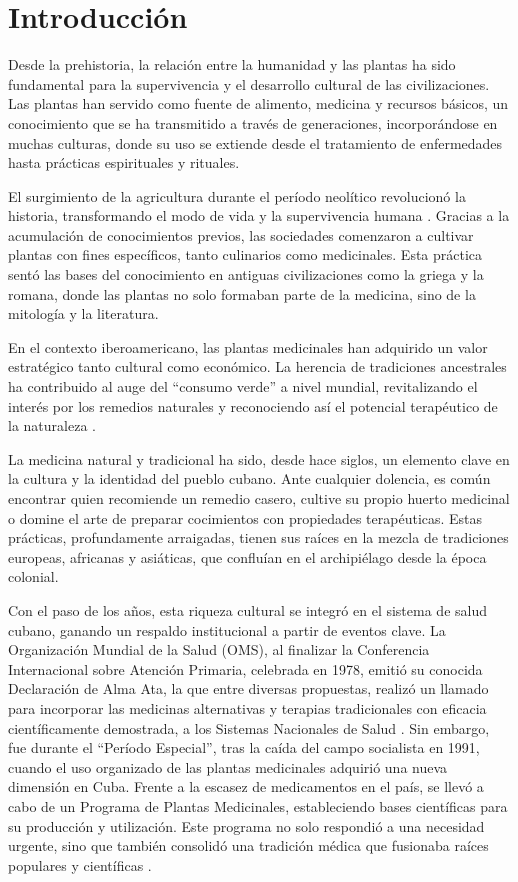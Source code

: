 \chapter*{Introducción}\label{chapter:introduction}

Desde la prehistoria, la relación entre la humanidad y las plantas ha sido fundamental 
para la supervivencia y el desarrollo cultural de las civilizaciones. 
Las plantas han servido como fuente de alimento, medicina y recursos básicos, 
un conocimiento que se ha transmitido a través de generaciones, 
incorporándose en muchas culturas, donde su uso se extiende desde el tratamiento de enfermedades 
hasta prácticas espirituales y rituales.

El surgimiento de la agricultura durante el período neolítico revolucionó la historia, 
transformando el modo de vida y la supervivencia humana \cite{Crespo2022}. 
Gracias a la acumulación de conocimientos previos, las sociedades comenzaron a cultivar 
plantas con fines específicos, tanto culinarios como medicinales. 
Esta práctica sentó las bases del conocimiento en antiguas civilizaciones como 
la griega y la romana, donde las plantas no solo formaban parte de la medicina, 
sino de la mitología y la literatura.

En el contexto iberoamericano, las plantas medicinales han adquirido un valor 
estratégico tanto cultural como económico. La herencia de tradiciones ancestrales 
ha contribuido al auge del \enquote{consumo verde} a nivel mundial, 
revitalizando el interés por los remedios naturales y reconociendo así el potencial 
terapéutico de la naturaleza \cite{Ocampo2002}.

La medicina natural y tradicional ha sido, desde hace siglos, un elemento clave 
en la cultura y la identidad del pueblo cubano. Ante cualquier dolencia, es común 
encontrar quien recomiende un remedio casero, cultive su propio huerto medicinal o 
domine el arte de preparar cocimientos con propiedades terapéuticas. Estas prácticas, 
profundamente arraigadas, tienen sus raíces en la mezcla de tradiciones europeas, 
africanas y asiáticas, que confluían en el archipiélago desde la época colonial.

Con el paso de los años, esta riqueza cultural se integró en el sistema de salud cubano, 
ganando un respaldo institucional a partir de eventos clave. 
La Organización Mundial de la Salud (OMS), al finalizar la Conferencia Internacional 
sobre Atención Primaria, celebrada en 1978, emitió su conocida Declaración de Alma Ata, 
la que entre diversas propuestas, realizó un llamado para incorporar las medicinas 
alternativas y terapias tradicionales con eficacia científicamente demostrada, 
a los Sistemas Nacionales de Salud \cite{Ocampo2002}. Sin embargo, fue durante el 
``Período Especial'', tras la caída del campo socialista en 1991, 
cuando el uso organizado de las plantas medicinales adquirió una nueva dimensión en Cuba. 
Frente a la escasez de medicamentos en el país, se llevó a cabo de un Programa de Plantas Medicinales, 
estableciendo bases científicas para su producción y utilización. 
Este programa no solo respondió a una necesidad urgente, sino que también consolidó 
una tradición médica que fusionaba raíces populares y científicas \cite{Lopez2019}.


